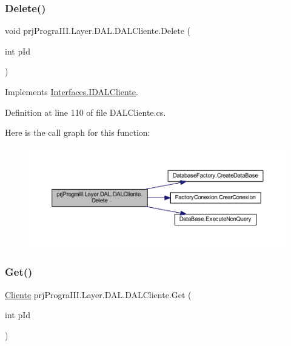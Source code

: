\subsubsection{\texorpdfstring{Delete()}{Delete()}}
{\footnotesize\ttfamily void prj\+Progra\+I\+I\+I.\+Layer.\+D\+A\+L.\+D\+A\+L\+Cliente.\+Delete (\begin{DoxyParamCaption}\item[{int}]{p\+Id }\end{DoxyParamCaption})}



Implements \hyperlink{interface_interfaces_1_1_i_d_a_l_cliente_a1d5922d64bfd29e76bc6f26c60230c15}{Interfaces.\+I\+D\+A\+L\+Cliente}.



Definition at line 110 of file D\+A\+L\+Cliente.\+cs.

Here is the call graph for this function\+:
\nopagebreak
\begin{figure}[H]
\begin{center}
\leavevmode
\includegraphics[width=350pt]{classprj_progra_i_i_i_1_1_layer_1_1_d_a_l_1_1_d_a_l_cliente_aa864635af5a546442d825e34483cf736_cgraph}
\end{center}
\end{figure}
\hypertarget{classprj_progra_i_i_i_1_1_layer_1_1_d_a_l_1_1_d_a_l_cliente_a4012b382e3da25b5300a46f05a81efb3}{}\label{classprj_progra_i_i_i_1_1_layer_1_1_d_a_l_1_1_d_a_l_cliente_a4012b382e3da25b5300a46f05a81efb3} 
\subsubsection{\texorpdfstring{Get()}{Get()}}
{\footnotesize\ttfamily \hyperlink{classprj_progra_i_i_i_1_1_layer_1_1_entities_1_1_cliente}{Cliente} prj\+Progra\+I\+I\+I.\+Layer.\+D\+A\+L.\+D\+A\+L\+Cliente.\+Get (\begin{DoxyParamCaption}\item[{int}]{p\+Id }\end{DoxyParamCaption})}



